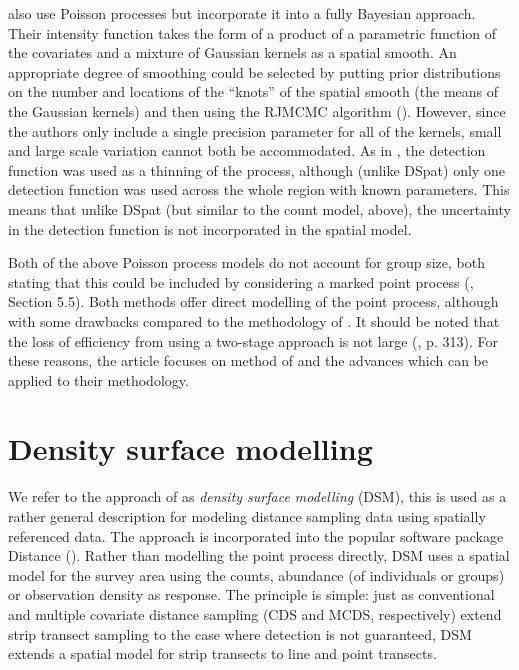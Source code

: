 \documentclass[a4paper,12pt]{article}
\begin{document}
\cite{Niemi:2010kx} also use Poisson processes but incorporate it into a fully Bayesian approach. Their intensity function takes the form of a product of a parametric function of the covariates and a mixture of Gaussian kernels as a spatial smooth. An appropriate degree of smoothing could be selected by putting prior distributions on the number and locations of the ``knots'' of the spatial smooth (the means of the Gaussian kernels) and then using the RJMCMC algorithm (\cite{GREEN:1995dg}). However, since the authors only include a single precision parameter for all of the kernels, small and large scale variation cannot both be accommodated. As in \cite{Johnson:2010gf}, the detection function was used as a thinning of the process, although (unlike DSpat) only one detection function was used across the whole region with known parameters. This means that unlike DSpat (but similar to the count model, above), the uncertainty in the detection function is not incorporated in the spatial model.

Both of the above Poisson process models do not account for group size, both stating that this could be included by considering a marked point process (\cite{cox1980point}, Section 5.5). Both methods offer direct modelling of the point process, although with some drawbacks compared to the methodology of \cite{Hedley:2004et}. It should be noted that the loss of efficiency from using a two-stage approach is not large (\cite{Buckland:2004ts}, p. 313). For these reasons, the article focuses on method of \cite{Hedley:2004et} and the advances which can be applied to their methodology.

\section*{Density surface modelling}
\label{s:dsm}

We refer to the approach of \cite{Hedley:2004et} as \textit{density surface modelling} (DSM), this is used as a rather general description for modeling distance sampling data using spatially referenced data. The approach is incorporated into the popular software package Distance (\cite{Thomas:2010cf}). Rather than modelling the point process directly, DSM  uses a spatial model for the survey area using the counts, abundance (of individuals or groups) or observation density as response. The principle is simple: just as conventional and multiple covariate distance sampling (CDS and MCDS, respectively) extend strip transect sampling to the case where detection is not guaranteed, DSM extends a spatial model for strip transects to line and point transects.
\end{document}
